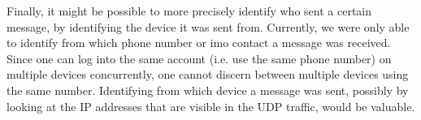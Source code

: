 \documentclass[conference]{IEEEtran}
\begin{document}
Finally, it might be possible to more precisely identify who sent a certain
message, by identifying the device it was sent from. Currently, we were only
able to identify from which phone number or imo contact a message was received.
Since one can log into the same account (i.e. use the same phone
number) on multiple devices concurrently, one cannot discern between multiple
devices using the same number. Identifying from which device a message was
sent, possibly by looking at the IP addresses that are visible in the UDP traffic, would
be valuable.


\printbibliography
\end{document}
